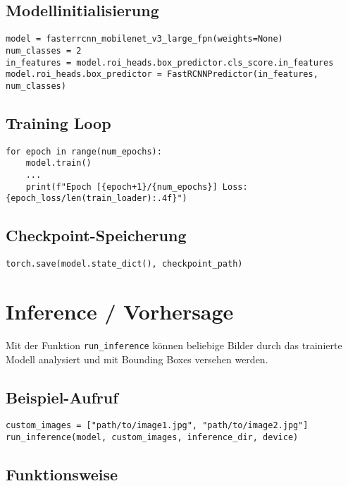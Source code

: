 \documentclass[11pt,a4paper]{article}
\begin{document}
\subsection{Modellinitialisierung}

\begin{lstlisting}
model = fasterrcnn_mobilenet_v3_large_fpn(weights=None)
num_classes = 2
in_features = model.roi_heads.box_predictor.cls_score.in_features
model.roi_heads.box_predictor = FastRCNNPredictor(in_features, num_classes)
\end{lstlisting}

\subsection{Training Loop}

\begin{lstlisting}
for epoch in range(num_epochs):
    model.train()
    ...
    print(f"Epoch [{epoch+1}/{num_epochs}] Loss: {epoch_loss/len(train_loader):.4f}")
\end{lstlisting}

\subsection{Checkpoint-Speicherung}

\begin{lstlisting}
torch.save(model.state_dict(), checkpoint_path)
\end{lstlisting}

\section{Inference / Vorhersage}

Mit der Funktion \texttt{run\_inference} können beliebige Bilder durch das trainierte Modell analysiert und mit Bounding Boxes versehen werden.

\subsection{Beispiel-Aufruf}

\begin{lstlisting}
custom_images = ["path/to/image1.jpg", "path/to/image2.jpg"]
run_inference(model, custom_images, inference_dir, device)
\end{lstlisting}

\subsection{Funktionsweise}
\end{document}
